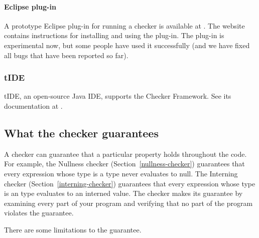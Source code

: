 \paragraph{Eclipse plug-in}

A prototype Eclipse plug-in for running a checker is available at
.  
The website contains instructions for installing and using the plug-in.
The plug-in is
experimental now, but some people have used it successfully (and we have fixed
all bugs that have been reported so far).


\subsubsection{tIDE}

tIDE, an open-source Java IDE, supports the Checker Framework.  See its
documentation at .


\subsection{What the checker guarantees\label{checker-guarantees}}

A checker can guarantee that a particular property holds throughout the
code.  For example, the Nullness checker (Section~\ref{nullness-checker})
guarantees that every expression whose type is a  type never
evaluates to null.  The Interning checker (Section~\ref{interning-checker})
guarantees that every expression whose type is an  type
evaluates to an interned value.  The checker makes its guarantee by
examining every part of your program and verifying that no part of the
program violates the guarantee.

There are some limitations to the guarantee.

